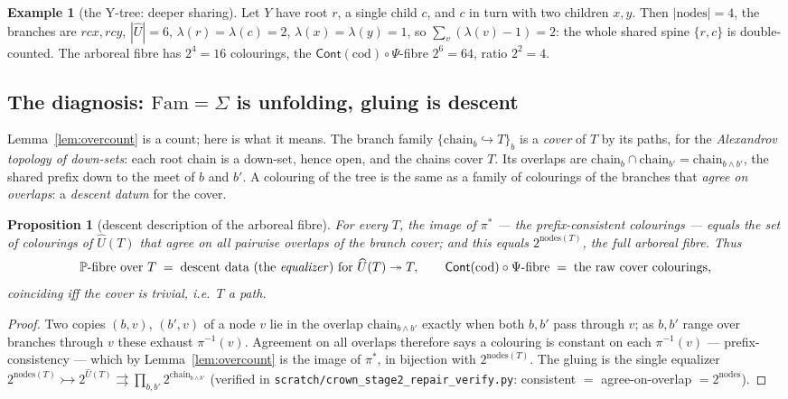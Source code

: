 \documentclass[11pt]{article}
\newtheorem{proposition}[theorem]{Proposition}
\theoremstyle{definition}
\newtheorem{example}[theorem]{Example}
\newcommand{\Cont}{\mathsf{Cont}}
\newcommand{\Fam}{\mathrm{Fam}}
\newcommand{\cod}{\mathrm{cod}}
\newcommand{\nodes}{\mathrm{nodes}}
\newcommand{\Pfib}{\mathbb{P}}
\newcommand{\Uf}{\widehat{U}}
\newcommand{\inpr}{\hookrightarrow}
\begin{document}
\begin{example}[the Y-tree: deeper sharing]\label{ex:y}
Let $Y$ have root $r$, a single child $c$, and $c$ in turn with two children $x,y$. Then
$|\nodes|=4$, the branches are $rcx,rcy$, $|\Uf|=6$, $\lambda(r)=\lambda(c)=2$,
$\lambda(x)=\lambda(y)=1$, so $\sum_v(\lambda(v)-1)=2$: the whole shared spine $\{r,c\}$ is
double-counted. The arboreal fibre has $2^4=16$ colourings, the $\Cont(\cod)\circ\Psi$-fibre
$2^6=64$, ratio $2^2=4$.
\end{example}

\subsection{The diagnosis: $\Fam=\Sigma$ is unfolding, gluing is descent}

Lemma~\ref{lem:overcount} is a count; here is what it means. The branch family
$\{\mathrm{chain}_b\inpr T\}_b$ is a \emph{cover} of $T$ by its paths, for the \emph{Alexandrov
topology of down-sets}: each root chain is a down-set, hence open, and the chains cover $T$. Its
overlaps are $\mathrm{chain}_b\cap\mathrm{chain}_{b'}=\mathrm{chain}_{b\wedge b'}$, the shared prefix
down to the meet of $b$ and $b'$. A colouring of the tree is the same as a family of colourings of
the branches that \emph{agree on overlaps}: a \emph{descent datum} for the cover.

\begin{proposition}[descent description of the arboreal fibre]\label{prop:descent}
For every $T$, the image of $\pi^*$ --- the prefix-consistent colourings --- equals the set of
colourings of $\Uf(T)$ that agree on all pairwise overlaps of the branch cover; and this equals
$2^{\nodes(T)}$, the full arboreal fibre. Thus
\[
\Pfib\text{-fibre over }T
\;=\;\text{descent data (the \emph{equalizer}) for } \Uf(T)\twoheadrightarrow T,
\qquad
\Cont(\cod)\circ\Psi\text{-fibre}\;=\;\text{the raw cover colourings,}
\]
coinciding iff the cover is trivial, i.e.\ $T$ a path.
\end{proposition}

\begin{proof}
Two copies $(b,v)$, $(b',v)$ of a node $v$ lie in the overlap $\mathrm{chain}_{b\wedge b'}$ exactly
when both $b,b'$ pass through $v$; as $b,b'$ range over branches through $v$ these exhaust
$\pi^{-1}(v)$. Agreement on all overlaps therefore says a colouring is constant on each
$\pi^{-1}(v)$ --- prefix-consistency --- which by Lemma~\ref{lem:overcount} is the image of $\pi^*$,
in bijection with $2^{\nodes(T)}$. The gluing is the single equalizer
$2^{\nodes(T)}\rightarrowtail 2^{\Uf(T)}\rightrightarrows\prod_{b,b'}2^{\mathrm{chain}_{b\wedge b'}}$
(verified in \texttt{scratch/crown\_stage2\_repair\_verify.py}: consistent $=$ agree-on-overlap $=
2^{\nodes}$).
\end{proof}
\end{document}
